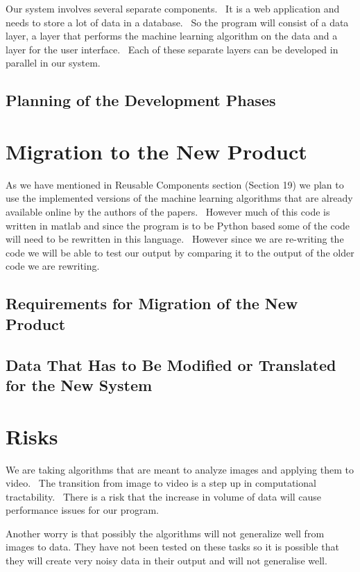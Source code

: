 \documentclass{scrreprt}
\begin{document}
{Our system involves several separate components. ~It is a web
application and needs to store a lot of data in a database. ~So the
program will consist of a data layer, a layer that performs the machine
learning algorithm on the data and a layer for the user interface. ~Each
of these separate layers can be developed in parallel in our system.}

\subsection{Planning of the Development Phases}

\section{Migration to the New Product}

{As we have mentioned in Reusable Components section (Section 19) we
plan to use the implemented versions of the machine learning algorithms
that are already available online by the authors of the papers. ~However
much of this code is written in matlab and since the program is to be
Python based some of the code will need to be rewritten in this
language. ~However since we are re-writing the code we will be able to
test our output by comparing it to the output of the older code we are
rewriting.}

\subsection{Requirements for Migration of the New Product}

\subsection{Data That Has to Be Modified or Translated for the New
            System}

\section{Risks}

{We are taking algorithms that are meant to analyze images and applying
them to video. ~The transition from image to video is a step up in
computational tractability. ~There is a risk that the increase in volume
of data will cause performance issues for our program.}

{Another worry is that possibly the algorithms will not generalize well
from images to data. They have not been tested on these tasks so it is
possible that they will create very noisy data in their output and will
not generalise well.}
\end{document}
